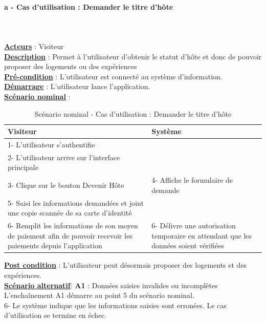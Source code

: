 \paragraph{a - Cas d'utilisation : Demander le titre d’hôte} 
$ $\\$ $\\\underline{\textbf{Acteurs}} : Visiteur
\\\underline{\textbf{Description}}  : Permet à l’utilisateur d’obtenir le statut d'hôte et donc de pouvoir proposer des logements ou des expériences
\\\underline{\textbf{Pré-condition}} : L'utilisateur est connecté au système d’information.
\\\underline{\textbf{Démarrage}} : L’utilisateur lance l’application.
\\\underline{\textbf{Scénario nominal}} :

\begin{table}[H]
\begin{center}
\begin{tabular}{|p{8cm}|p{8cm}|}
\hline
Visiteur & Système\\
\hline
1- L’utilisateur s’authentifie & $ $\\
\hline	
2- L’utilisateur arrive sur l’interface principale & $ $\\
\hline 	
3- Clique sur le bouton Devenir Hôte & 4- Affiche le formulaire de demande\\
\hline
5- Saisi les informations demandées et joint une copie scannée de sa carte d'identité & $ $\\
\hline	
6- Remplit les informations de son moyen de paiement afin de pouvoir recevoir les paiements depuis l’application & 6- Délivre une autorisation temporaire en attendant que les données soient vérifiées\\
\hline
\end{tabular}
\caption{Scénario nominal - Cas d'utilisation : Demander le titre d'hôte}
\end{center}
\end{table}

\begin{flushleft}
 \underline{\textbf{Post condition}} : L’utilisateur peut désormais proposer des logements et des expériences.
\\\underline{\textbf{Scénario alternatif}}:
\textbf{A1} : Données saisies invalides ou incomplètes
\\L'enchaînement A1 démarre au point 5 du scénario nominal.
\\6- Le système indique que les informations saisies sont erronées. Le cas d’utilisation se termine en échec.
\end{flushleft}

